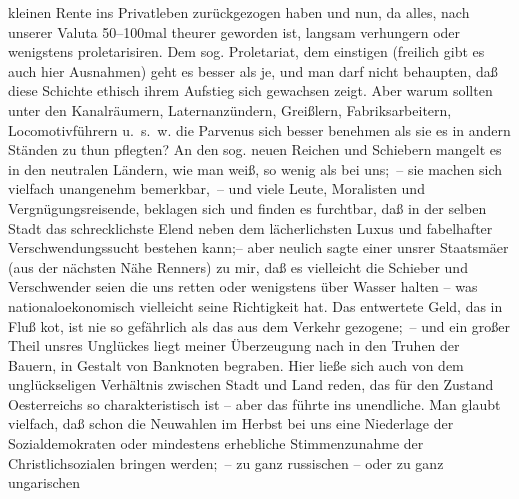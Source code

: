 \begin{ledgroupsized}[t]{13cm}
               kleinen Rente ins Privatleben zurückgezogen haben und nun, da alles, nach unserer
               Valuta 50–100mal theurer geworden ist, langsam verhungern oder wenigstens
               proletarisiren. Dem sog. Proletariat, dem einstigen (freilich gibt es auch hier
               Ausnahmen) geht es besser als je, und man darf nicht behaupten, daß diese Schichte
               ethisch ihrem Aufstieg sich gewachsen zeigt. Aber \introOben{}warum\introOben{}
               sollten unter den Kanalräumern, Laternanzündern, Greißlern, Fabriksarbeitern,
               Locomotivführern u. s. w. die Parvenus sich besser benehmen als sie es in andern
               Ständen zu thun pflegten? {\pb}An den sog. neuen
               Reichen und Schiebern mangelt es in den neutralen Ländern, wie man weiß, so wenig als
               bei uns; – sie machen sich vielfach unangenehm bemerkbar, – und viele Leute,
               Moralisten und Vergnügungsreisende, beklagen sich und finden es furchtbar, daß in der
               selben Stadt das schrecklichste Elend neben dem lächerlichsten Luxus und fabelhafter
               Verschwendungssucht bestehen kann;– aber neulich sagte einer unsrer Staatsmä{\geminationn}er
               (aus der nächsten Nähe Renners) zu mir, daß es
               vielleicht die Schieber und Verschwender seien die uns retten oder wenigstens über
               Wasser halten – was nationaloekonomisch vielleicht seine Richtigkeit hat. Das
               entwertete Geld, das in Fluß ko{\geminationm}t, ist nie so gefährlich
               als das aus dem Verkehr gezogene; – und ein großer Theil unsres Unglückes liegt
               meiner Überzeugung nach in den Truhen der Bauern, in Gestalt von Banknoten begraben.
               Hier ließe sich auch von dem unglückseligen Verhältnis zwischen Stadt {\pb}und Land reden, das für den Zustand Oesterreichs so charakteristisch ist – aber das
               führte ins unendliche. Man glaubt vielfach, daß schon die Neuwahlen im Herbst bei uns
               eine Niederlage der Sozialdemokraten oder mindestens erhebliche Stimmenzunahme der
               Christlichsozialen bringen werden; – zu ganz russischen – oder zu ganz ungarischen

\end{ledgroupsized}
